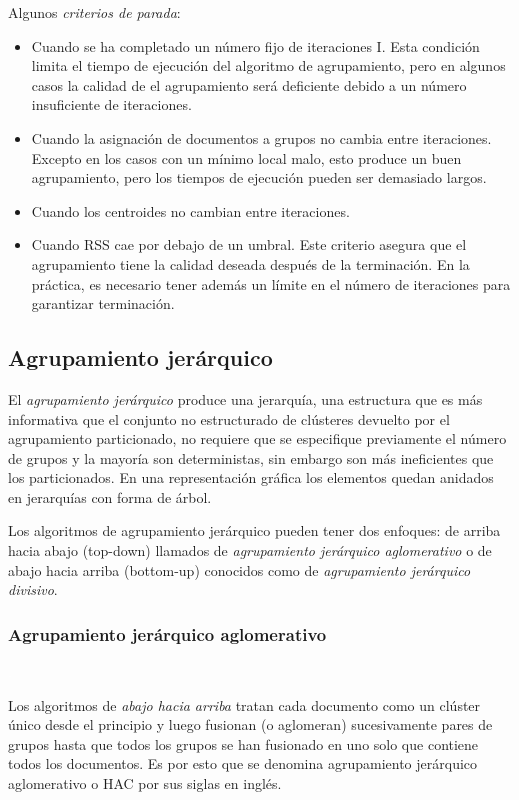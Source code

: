 \documentclass{llncs}
\begin{document}
Algunos \textit{criterios de parada}:
\begin{itemize}
	\item Cuando se ha completado un número fijo de iteraciones I. Esta condición limita el tiempo de ejecución del algoritmo de agrupamiento, pero en algunos casos la calidad de el agrupamiento será deficiente debido a un número insuficiente de iteraciones.
	\item Cuando la asignación de documentos a grupos no cambia entre iteraciones. Excepto en los casos con un m\'inimo local malo, esto produce un buen agrupamiento, pero los tiempos de ejecución pueden ser demasiado largos.
	\item Cuando los centroides no cambian entre iteraciones.
	\item Cuando RSS cae por debajo de un umbral. Este criterio asegura que el agrupamiento tiene la calidad deseada después de la terminación. En la práctica, es necesario tener adem\'as un límite en el número de iteraciones para garantizar terminación.
\end{itemize}

\subsection{Agrupamiento jer\'arquico}

El \textit{agrupamiento jerárquico} produce una jerarquía, una estructura que es más informativa que el conjunto no estructurado de clústeres devuelto por el agrupamiento particionado, no requiere que se especifique previamente el número de grupos y la mayoría son deterministas, sin embargo son m\'as ineficientes que los particionados. En una representación gráfica los elementos quedan anidados en jerarquías con forma de árbol.

Los algoritmos de agrupamiento jerárquico pueden tener dos enfoques: de arriba hacia abajo (top-down) llamados de \textit{agrupamiento jer\'arquico aglomerativo} o de abajo hacia arriba (bottom-up) conocidos como de \textit{agrupamiento jer\'arquico divisivo}. 

\subsubsection{Agrupamiento jer\'arquico aglomerativo}
\textcolor{white}{.}

\vspace{0.5em}
Los algoritmos de \textit{abajo hacia arriba} tratan cada documento como un clúster único desde el principio y luego fusionan (o aglomeran) sucesivamente pares de grupos hasta que todos los grupos se han fusionado en uno solo que contiene todos los documentos. 
Es por esto que se denomina agrupamiento jerárquico aglomerativo o HAC por sus siglas en ingl\'es. 
\end{document}
